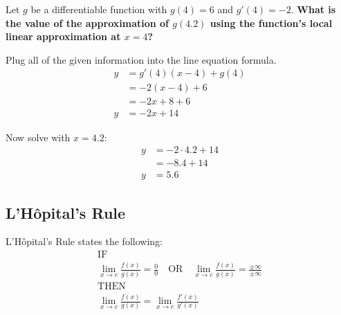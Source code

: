 \documentclass[12pt]{article}
\begin{document}
\noindent Let $g$ be a differentiable function with $g(4) = 6$ and $g'(4) = -2$. \textbf{What is the value of the approximation of $g(4.2)$ using the function's local linear approximation at $x=4$?}

\begin{center}
    Plug all of the given information into the line equation formula.
    \begin{align*}
        y & = g'(4)(x-4) + g(4) \\
          & = -2(x-4) + 6       \\
          & = -2x + 8 + 6       \\
        y & = -2x + 14
    \end{align*}

    Now solve with $x=4.2$:
    \begin{align*}
        y & = -2 \cdot 4.2 + 14 \\
          & = -8.4 + 14         \\
        y & = 5.6
    \end{align*}
\end{center}

\subsection{L'Hôpital's Rule} %
\noindent L'Hôpital's Rule states the following:
\begin{gather*}
    \text{IF} \\
    \lim_{x \to c} \frac{f(x)}{g(x)} = \frac{0}{0} \quad \text{OR} \quad \lim_{x \to c} \frac{f(x)}{g(x)} = \frac{\pm \infty}{\pm \infty} \\[6pt]
    \text{THEN} \\
    \lim_{x \to c} \frac{f(x)}{g(x)} = \lim_{x \to c} \frac{f'(x)}{g'(x)}
\end{gather*}
\end{document}
